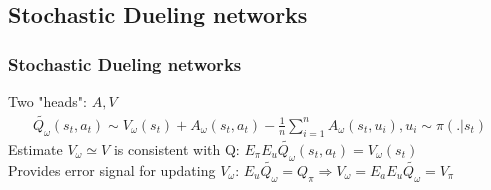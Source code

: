 \documentclass{beamer}
\begin{document}
\subsection{Stochastic Dueling networks}
\begin{frame}
\frametitle{Stochastic Dueling networks}
Two "heads": $A, V$
\begin{align*}
\tilde{Q_\omega} (s_t, a_t) \sim V_\omega (s_t) + A_\omega(s_t, a_t) - \frac{1}{n} \sum_{i=1}^n A_\omega (s_t, u_i), u_i \sim \pi(.|s_t)
\end{align*}
Estimate $V_\omega \simeq V$ is consistent with Q: $E_\pi E_u \tilde{Q_\omega} (s_t, a_t) = V_\omega (s_t)$\\
Provides error signal for updating $V_\omega$: $E_u \tilde{Q_\omega} = Q_\pi \Rightarrow V_\omega = E_a E_u \tilde{Q_\omega} = V_\pi$
\end{frame}
\end{document}
